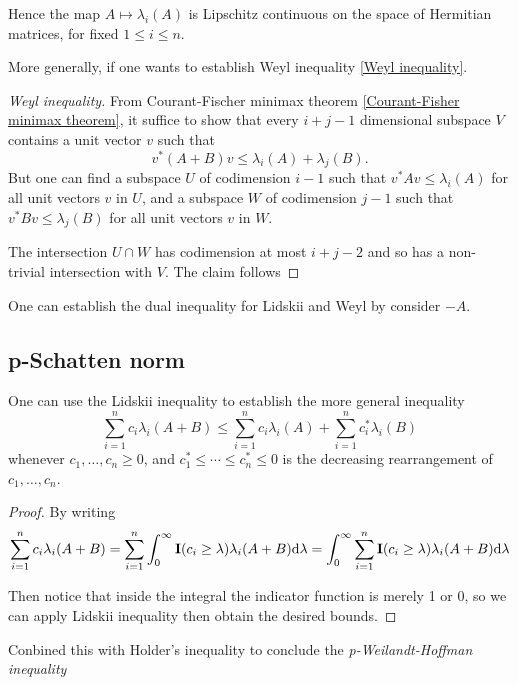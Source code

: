 Hence the map $A \mapsto \lambda_i(A)$ is Lipschitz continuous on the space of Hermitian matrices, for fixed $1\leq i\leq n$.

More generally, if one wants to establish Weyl inequality \ref{Weyl inequality}. 

\begin{proof}[Weyl inequality]
From Courant-Fischer minimax theorem \ref{Courant-Fisher minimax theorem}, it suffice to show that every $i+j-1$ dimensional subspace $V$ contains a unit vector $v$ such that
\begin{equation*}
    v^*(A+B)v \leq \lambda_i(A)+\lambda_j(B).
\end{equation*}
But one can find a subspace $U$ of codimension $i-1$ such that $v^*Av \leq \lambda_i(A)$ for all unit vectors $v$ in $U$, and a subspace $W$ of codimension $j-1$ such that $v^*Bv\leq\lambda_j(B)$ for all unit vectors $v$ in $W$.

The intersection $U\cap W$ has codimension at most  $i+j-2$ and so has a non-trivial intersection with $V$. The claim follows 
\end{proof}

One can establish the dual inequality for Lidskii and Weyl by consider $-A$.

\subsection{p-Schatten norm}
One can use the Lidskii inequality to establish the more general inequality
\begin{equation*}
    \sum_{i=1}^n c_i \lambda_i(A+B) \leq \sum_{i=1}^n c_i \lambda_i(A)+\sum_{i=1}^n c_i^* \lambda_i(B)
\end{equation*}
whenever $c_1,\dots,c_n \geq 0$, and $c_1^* \leq \cdots \leq c_n^* \leq 0$ is the decreasing rearrangement of $c_1,\dots,c_n$.

\begin{proof}
    
    By writing
    \begin{equation*}
        \sum_{i=1}^n c_i \lambda_i(A+B) = \sum_{i=1}^n \int^\infty_0 \mathbf I (c_i \geq \lambda) \lambda_i(A+B) \mathrm{d} \lambda =\int^\infty_0 \sum_{i=1}^n  \mathbf I (c_i \geq \lambda) \lambda_i(A+B) \mathrm{d} \lambda
    \end{equation*}
    
    Then notice that inside the integral the indicator function is merely 1 or 0, so we can apply Lidskii inequality then obtain the desired bounds.
    
\end{proof} 
Conbined this with Holder's inequality to conclude the \textit{p-Weilandt-Hoffman inequality}


